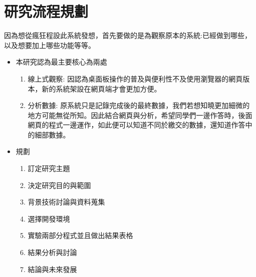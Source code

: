 \section{研究流程規劃}

因為想從瘋狂程設此系統發想，首先要做的是為觀察原本的系統:已經做到哪些，以及想要加上哪些功能等等。

\begin{itemize}%
	\item 本研究認為最主要核心為兩處
		\begin{enumerate}[1.]%
			\item 線上式觀察:
			因認為桌面板操作的普及與便利性不及使用瀏覽器的網頁版本，新的系統架設在網頁端才會更加方便。
			\item 分析數據:
			原系統只是記錄完成後的最終數據，我們若想知曉更加細微的地方可能無從所知。因此結合網頁與分析，希望同學們一邊作答時，後面網頁的程式一邊運作，如此便可以知道不同於繳交的數據，還知道作答中的細部數據。
		\end{enumerate}

	\item 規劃
		\begin{enumerate}[1.]
			\item 訂定研究主題
			\item 決定研究目的與範圍
			\item 背景技術討論與資料蒐集
			\item 選擇開發環境
			\item 實驗兩部分程式並且做出結果表格
			\item 結果分析與討論
			\item 結論與未來發展
		\end{enumerate}
\end{itemize}
\newpage

